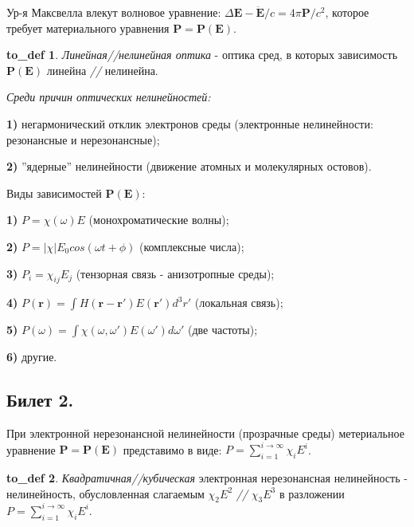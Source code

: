 \documentclass[a4paper,12pt]{article}
\theoremstyle{definition} %
\theoremstyle{definition} %
\newtheorem{to_def}{to_def}[section]
\theoremstyle{remark} %
\begin{document}
Ур-я Максвелла влекут волновое уравнение: $\Delta \mathbf{E}-\ddot{\mathbf{E}}/c=4\pi \mathbf{P}/c^{2}$, которое требует материального уравнения $\mathbf{P} = \mathbf{P}(\mathbf{E})$.

\begin{to_def}
	\textit{Линейная//нелинейная оптика} - оптика сред, в которых зависимость $\mathbf{P}(\mathbf{E})$ линейна \textit{//} нелинейна.
\end{to_def}

\textit{Среди причин оптических нелинейностей:} \\
	\par \textbf{1)} негармонический отклик электронов среды (электронные нелинейности: резонансные и нерезонансные); \\
	\par \textbf{2)} ''ядерные'' нелинейности (движение атомных и молекулярных остовов).


Виды зависимостей $\mathbf{P}(\mathbf{E})$: \\
     \par \textbf{1)} $P=\chi (\omega) E$ (монохроматические волны); \\
     \par \textbf{2)} $P=|\chi|E_{0}cos(\omega t + \phi)$ (комплексные числа); \\
     \par \textbf{3)} $P_{i}=\chi_{ij}E_{j}$ (тензорная связь - анизотропные среды); \\
	 \par \textbf{4)} $P(\mathbf{r}) = \int H(\mathbf{r}-\mathbf{r}') E(\mathbf{r}') d^{3}r'$ (локальная связь); \\
	 \par \textbf{5)} $P(\omega) = \int \chi (\omega, \omega') E(\omega') d\omega'$ (две частоты); \\
	 \par \textbf{6)} другие.


\subsection{Билет 2.}


При электронной нерезонансной нелинейности (прозрачные среды) метериальное уравнение $\mathbf{P}=\mathbf{P}(\mathbf{E})$ представимо в виде: $P=\sum\limits_{i=1}^{i \to \infty} \chi_{i} E^{i}$.

\begin{to_def}
	\textit{Квадратичная//кубическая} электронная нерезонансная нелинейность - нелинейность, обусловленная слагаемым $\chi_{2} E^{2}$ \textit{//} $\chi_{3} E^{3}$ в разложении $P=\sum\limits_{i=1}^{i \to \infty} \chi_{i} E^{i}$.
\end{to_def}
\end{document}
